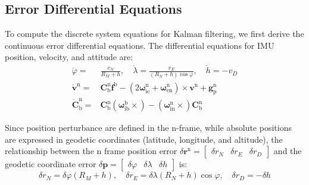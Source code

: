 \documentclass{article}
\begin{document}
\subsection{Error Differential Equations}

To compute the discrete system equations for Kalman filtering, we first derive the continuous error differential equations. The differential equations for IMU position, velocity, and attitude are:
\begin{equation}
    \begin{aligned}
        \dot \varphi =& \frac{{v_N}}{{R_M+h}}, \quad \dot \lambda = \frac{{v_E}}{{(R_N+h)}\cos\varphi}, \quad \dot {{h}} = {-v_D} \\
        \dot{\boldsymbol{v}}^{\mathrm{n}} =& \mathbf{C}_{\mathrm{b}}^{\mathrm{n}}\boldsymbol{f}^{\mathrm{b}}-(2\boldsymbol{\omega }_{\mathrm{ie}}^{\mathrm{n}}+\boldsymbol{\omega }_{\mathrm{en}}^{\mathrm{n}})\times \boldsymbol{v}^{\mathrm{n}}+\boldsymbol{g}_{\mathrm{p}}^{\mathrm{n}} \\
        \dot{\mathbf{C}}_{\mathrm{b}}^{\mathrm{n}} =& \mathbf{C}_{\mathrm{b}}^{\mathrm{n}} (\boldsymbol{\omega}_{\mathrm{ib}}^{\mathrm{b}} \times) - (\boldsymbol{\omega}_{\mathrm{in}}^{\mathrm{n}} \times) \mathbf{C}_{\mathrm{b}}^{\mathrm{n}}
    \end{aligned}
    \label{eq:navigation-state-difference-equations}
\end{equation}

Since position perturbance are defined in the $\mathrm{n}$-frame, while absolute positions are expressed in geodetic coordinates (latitude, longitude, and altitude), the relationship between the $\mathrm{n}$ frame position error $\delta \boldsymbol{r}^{\mathrm{n}} = \begin{bmatrix} \delta r_{N} & \delta r_E & \delta r_D \end{bmatrix}$ and the geodetic coordinate error $\delta \boldsymbol{p} = \begin{bmatrix}\delta \varphi & \delta \lambda & \delta h\end{bmatrix}$ is:
\begin{equation}
    \delta {r_{N}} = \delta\varphi({R_M+h}), \quad
    \delta {r_{E}} = \delta\lambda({R_{N}+h})\cos\varphi, \quad
    \delta {r_{D}} = -\delta{h} 
\end{equation}
\end{document}
